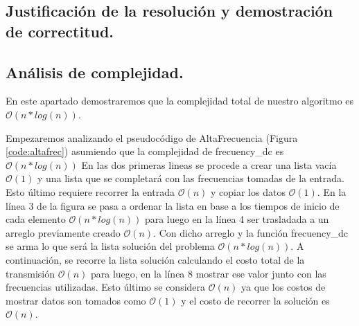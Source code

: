 \vspace*{0.6cm}

\subsection{Justificación de la resolución y demostración de correctitud.}

\vspace*{0.3cm}



\vspace*{0.6cm}

\subsection{Análisis de complejidad.}

\vspace*{0.3cm}

En este apartado demostraremos que la complejidad total de nuestro algoritmo es $\mathcal{O}(n*log(n))$.

Empezaremos analizando el pseudocódigo de AltaFrecuencia (Figura \ref{code:altafrec}) asumiendo que la complejidad de frecuency_dc es $\mathcal{O}(n*log(n))$
En las dos primeras lineas se procede a crear una lista vacía $\mathcal{O}(1)$ y una lista que se completará con las frecuencias tomadas de la entrada. Esto último requiere recorrer la entrada $\mathcal{O}(n)$ y copiar los datos $\mathcal{O}(1)$.
En la línea 3 de la figura se pasa a ordenar la lista en base a los tiempos de inicio de cada elemento $\mathcal{O}(n*log(n))$ para luego en la línea 4 ser trasladada a un arreglo previamente creado $\mathcal{O}(n)$. Con dicho arreglo y la función frecuency_dc se arma lo que será la lista solución del problema $\mathcal{O}(n*log(n))$. A continuación, se recorre la lista solución calculando el costo total de la transmisión $\mathcal{O}(n)$ para luego, en la línea 8 mostrar ese valor junto con las frecuencias utilizadas. Esto último se considera $\mathcal{O}(n)$ ya que los costos de mostrar datos son tomados como $\mathcal{O}(1)$ y el costo de recorrer la solución es $\mathcal{O}(n)$.

